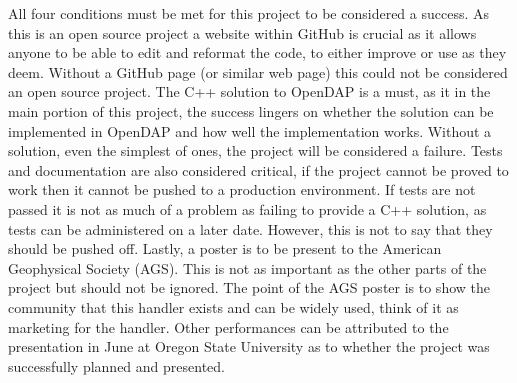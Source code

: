 \documentclass[letterpaper,10pt,draftclsnofoot,onecolumn]{IEEEtran}
\begin{document}
\indent All four conditions must be met for this project to be considered a success. As this is an open source project a website within GitHub is crucial as it allows anyone to be able to edit and reformat the code, to either improve or use as they deem. Without a GitHub page (or similar web page) this could not be considered an open source project. The C++ solution to OpenDAP is a must, as it in the main portion of this project, the success lingers on whether the solution can be implemented in OpenDAP and how well the implementation works. Without a solution, even the simplest of ones, the project will be considered a failure. Tests and documentation are also considered critical, if the project cannot be proved to work then it cannot be pushed to a production environment. If tests are not passed it is not as much of a problem as failing to provide a C++ solution, as tests can be administered on a later date. However, this is not to say that they should be pushed off. Lastly, a poster is to be present to the American Geophysical Society (AGS). This is not as important as the other parts of the project but should not be ignored. The point of the AGS poster is to show the community that this handler exists and can be widely used, think of it as marketing for the handler. Other performances can be attributed to the presentation in June at Oregon State University as to whether the project was successfully planned and presented.
\end{document}
